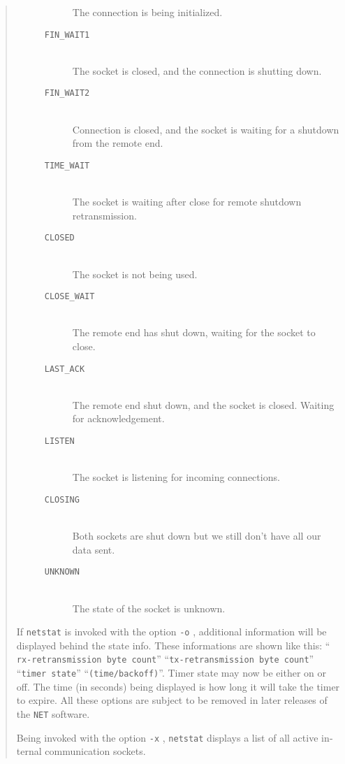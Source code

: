 \begin{appendix}
\begin{english}
\begin{quote}
\begin{description}
\begin{description}
					The connection is being initialized.
				\item[{\tt FIN\_WAIT1}]\mbox{}\\
					The socket is closed, and the connection is shutting down.
				\item[{\tt FIN\_WAIT2}]\mbox{}\\
					Connection is closed, and the socket is waiting for
					a shutdown from the remote end.
				\item[{\tt TIME\_WAIT}]\mbox{}\\
					The socket is waiting after close for remote shutdown
					retransmission.
				\item[{\tt CLOSED}]\mbox{}\\
					The socket is not being used.
				\item[{\tt CLOSE\_WAIT}]\mbox{}\\
					The remote end has shut down, waiting for the
					socket to close.
				\item[{\tt LAST\_ACK}]\mbox{}\\
					The remote end shut down, and the socket is closed.
					Waiting for acknowledgement.
				\item[{\tt LISTEN}]\mbox{}\\
					The socket is listening for incoming connections.
				\item[{\tt CLOSING}]\mbox{}\\
					Both sockets are shut down but we still don't have
					all our data sent.
				\item[{\tt UNKNOWN}]\mbox{}\\
					The state of the socket is unknown.
				\end{description}
	\end{description}
	
	If {\tt netstat} is invoked with the option {\tt -o} , 
	additional information will be displayed behind the state
	info. These informations are shown like this: ``{\tt
	rx-retransmission byte count}'' ``{\tt tx-retransmission byte
	count}'' ``{\tt timer state}'' ``{\tt (time/backoff)}''. Timer state
	may now be either on or off. The time (in seconds) being displayed
	is how long it will take the timer to expire. All these options are
	subject to be removed in later releases of the {\tt NET} software.

	Being invoked with the option {\tt -x} , {\tt netstat} displays a
	list of all active {\Unix} internal communication sockets.


\end{quote}
\end{english}
\end{appendix}
